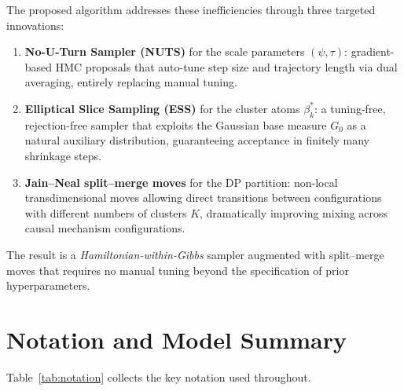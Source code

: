 \documentclass[12pt, a4paper]{article}
\theoremstyle{remark}
\begin{document}
The proposed algorithm addresses these inefficiencies through three
targeted innovations:
\begin{enumerate}[leftmargin=*, itemsep=2pt]
  \item \textbf{No-U-Turn Sampler (NUTS)} \cite{Hoffman2014} for the
    scale parameters $(\psi,\tau)$: gradient-based HMC proposals that
    auto-tune step size and trajectory length via dual averaging,
    entirely replacing manual tuning.
  \item \textbf{Elliptical Slice Sampling (ESS)} \cite{Murray2010}
    for the cluster atoms $\beta_k^*$: a tuning-free, rejection-free
    sampler that exploits the Gaussian base measure $G_0$ as a
    natural auxiliary distribution, guaranteeing acceptance in
    finitely many shrinkage steps.
  \item \textbf{Jain--Neal split--merge moves} \cite{Jain2004,Jain2007}
    for the DP partition: non-local transdimensional moves allowing
    direct transitions between configurations with different numbers
    of clusters $K$, dramatically improving mixing across causal
    mechanism configurations.
\end{enumerate}

The result is a \emph{Hamiltonian-within-Gibbs} sampler augmented
with split--merge moves that requires no manual tuning beyond the
specification of prior hyperparameters.

\section{Notation and Model Summary}

Table~\ref{tab:notation} collects the key notation used throughout.
\end{document}
